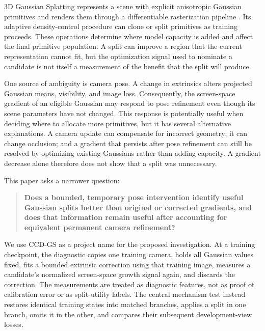 \documentclass[10pt]{article}
\newcommand{\method}{\textsc{CCD-GS}}
\begin{document}
3D Gaussian Splatting represents a scene with explicit anisotropic Gaussian
primitives and renders them through a differentiable rasterization pipeline
\cite{kerbl2023}. Its adaptive density-control procedure can clone or split
primitives as training proceeds. These operations determine where model
capacity is added and affect the final primitive population. A split can
improve a region that the current representation cannot fit, but the
optimization signal used to nominate a candidate is not itself a measurement
of the benefit that the split will produce.

One source of ambiguity is camera pose. A change in extrinsics alters
projected Gaussian means, visibility, and image loss. Consequently, the
screen-space gradient of an eligible Gaussian may respond to pose refinement
even though its scene parameters have not changed. This response is
potentially useful when deciding where to allocate more primitives, but it has
several alternative explanations. A camera update can compensate for incorrect
geometry; it can change occlusion; and a gradient that persists after pose
refinement can still be resolved by optimizing existing Gaussians rather than
adding capacity. A gradient decrease alone therefore does not show that a
split was unnecessary.

This paper asks a narrower question:

\begin{quote}
\textbf{Does a bounded, temporary pose intervention identify useful Gaussian
splits better than original or corrected gradients, and does that information
remain useful after accounting for equivalent permanent camera refinement?}
\end{quote}

We use \method{} as a project name for the proposed investigation. At a
training checkpoint, the diagnostic copies one training camera, holds all
Gaussian values fixed, fits a bounded extrinsic correction using that training
image, measures a candidate's normalized screen-space growth signal again,
and discards the correction. The measurements are treated as diagnostic
features, not as proof of calibration error or as split-utility labels. The
central mechanism test instead restores identical training states into
matched branches, applies a split in one branch, omits it in the other, and
compares their subsequent development-view losses.
\end{document}
